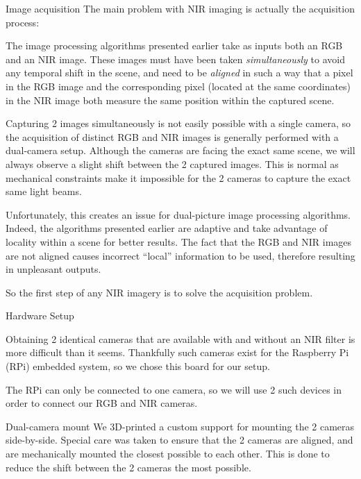 \documentclass[11pt]{article}
\begin{document}
\begin{section}{Image acquisition}
    The main problem with NIR imaging is actually the acquisition process:

    \medskip

    The image processing algorithms presented earlier take as inputs both an RGB and an NIR image. These images must have been taken \emph{simultaneously} to avoid any temporal shift in the scene, and need to be \emph{aligned} in such a way that a pixel in the RGB image and the corresponding pixel (located at the same coordinates) in the NIR image both measure the same position within the captured scene.

    \medskip

    Capturing 2 images simultaneously is not easily possible with a single camera, so the acquisition of distinct RGB and NIR images is generally performed with a dual-camera setup. Although the cameras are facing the exact same scene, we will always observe a slight shift between the 2 captured images. This is normal as mechanical constraints make it impossible for the 2 cameras to capture the exact same light beams.

    \medskip

    Unfortunately, this creates an issue for dual-picture image processing algorithms. Indeed, the algorithms presented earlier are adaptive and take advantage of locality within a scene for better results. The fact that the RGB and NIR images are not aligned causes incorrect ``local'' information to be used, therefore resulting in unpleasant outputs.

    \medskip

    So the first step of any NIR imagery is to solve the acquisition problem.

    \begin{subsection}{Hardware Setup}
        \label{sec:hardware}

        Obtaining 2 identical cameras that are available with and without an NIR filter is more difficult than it seems. Thankfully such cameras exist for the Raspberry Pi (RPi) embedded system, so we chose this board for our setup.

        \medskip

        The RPi can only be connected to one camera, so we will use 2 such devices in order to connect our RGB and NIR cameras.

        \begin{subsubsection}{Dual-camera mount}
            We 3D-printed a custom support for mounting the 2 cameras side-by-side. Special care was taken to ensure that the 2 cameras are aligned, and are mechanically mounted the closest possible to each other. This is done to reduce the shift between the 2 cameras the most possible.


\end{subsubsection}
\end{subsection}
\end{section}
\end{document}
